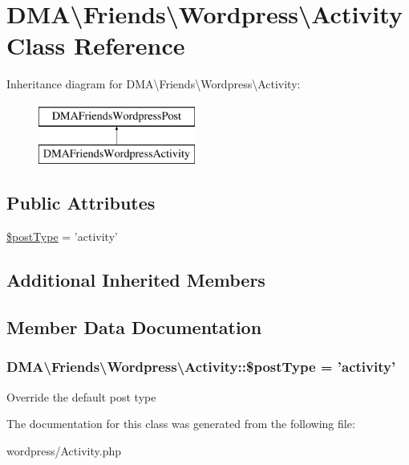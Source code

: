 \hypertarget{classDMA_1_1Friends_1_1Wordpress_1_1Activity}{\section{D\+M\+A\textbackslash{}Friends\textbackslash{}Wordpress\textbackslash{}Activity Class Reference}
\label{classDMA_1_1Friends_1_1Wordpress_1_1Activity}
}
Inheritance diagram for D\+M\+A\textbackslash{}Friends\textbackslash{}Wordpress\textbackslash{}Activity\+:\begin{figure}[H]
\begin{center}
\leavevmode
\includegraphics[height=2.000000cm]{de/d54/classDMA_1_1Friends_1_1Wordpress_1_1Activity}
\end{center}
\end{figure}
\subsection*{Public Attributes}
\begin{DoxyCompactItemize}
\item 
\hyperlink{classDMA_1_1Friends_1_1Wordpress_1_1Activity_a06a7b4fad854f04e2282f92e9829c3d3}{\$post\+Type} = 'activity'
\end{DoxyCompactItemize}
\subsection*{Additional Inherited Members}


\subsection{Member Data Documentation}
\hypertarget{classDMA_1_1Friends_1_1Wordpress_1_1Activity_a06a7b4fad854f04e2282f92e9829c3d3}{
\subsubsection[{\$post\+Type}]{\setlength{\rightskip}{0pt plus 5cm}D\+M\+A\textbackslash{}\+Friends\textbackslash{}\+Wordpress\textbackslash{}\+Activity\+::\$post\+Type = 'activity'}}\label{classDMA_1_1Friends_1_1Wordpress_1_1Activity_a06a7b4fad854f04e2282f92e9829c3d3}
Override the default post type 

The documentation for this class was generated from the following file\+:\begin{DoxyCompactItemize}
\item 
wordpress/Activity.\+php\end{DoxyCompactItemize}
